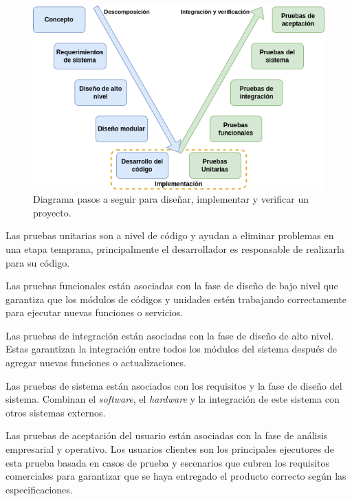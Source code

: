   \begin{figure}[htbp]
      \centering
      \includegraphics[width=\linewidth]{./Figures/verif.png}
      \caption{Diagrama pasos a seguir para diseñar, implementar y verificar un proyecto.}\label{fig:verif}
  \end{figure}


  Las pruebas unitarias son a nivel de código y ayudan a eliminar
  problemas en una etapa temprana, principalmente el desarrollador es responsable
  de realizarla para su código.

  Las pruebas funcionales están asociadas con la fase de diseño de bajo nivel
  que garantiza que los módulos de códigos y unidades estén trabajando correctamente
  para ejecutar nuevas funciones o servicios.

  Las pruebas de integración están asociadas con la fase de diseño de alto
  nivel. Estas garantizan la integración entre todos los módulos del sistema después
  de agregar nuevas funciones o actualizaciones.

  Las pruebas de sistema están asociados con los requisitos y la fase de
  diseño del sistema. Combinan el \textit{software}, el \textit{hardware} y la
  integración de este sistema con otros sistemas externos.

  Las pruebas de aceptación del usuario están asociadas con la fase de
  análisis empresarial y operativo. Los usuarios clientes son los principales
  ejecutores de esta prueba basada en casos de prueba y escenarios que cubren los
  requisitos comerciales para garantizar que se haya entregado el producto correcto
  según las especificaciones.

